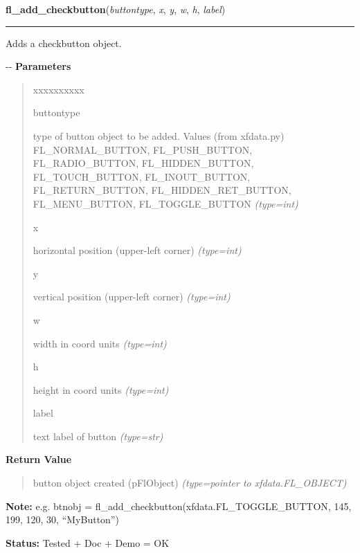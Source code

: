\hspace{.8\funcindent}\begin{boxedminipage}{\funcwidth}

    \raggedright \textbf{fl\_add\_checkbutton}(\textit{buttontype}, \textit{x}, \textit{y}, \textit{w}, \textit{h}, \textit{label})

    \vspace{-1.5ex}

    \rule{\textwidth}{0.5\fboxrule}
\setlength{\parskip}{2ex}

Adds a checkbutton object.

-{}-
\setlength{\parskip}{1ex}
      \textbf{Parameters}
      \vspace{-1ex}

      \begin{quote}
        \begin{Ventry}{xxxxxxxxxx}

          \item[buttontype]


type of button object to be added. Values (from xfdata.py)
FL\_NORMAL\_BUTTON, FL\_PUSH\_BUTTON, FL\_RADIO\_BUTTON, FL\_HIDDEN\_BUTTON,
FL\_TOUCH\_BUTTON, FL\_INOUT\_BUTTON, FL\_RETURN\_BUTTON,
FL\_HIDDEN\_RET\_BUTTON, FL\_MENU\_BUTTON, FL\_TOGGLE\_BUTTON
            {\it (type=int)}

          \item[x]


horizontal position (upper-left corner)
            {\it (type=int)}

          \item[y]


vertical position (upper-left corner)
            {\it (type=int)}

          \item[w]


width in coord units
            {\it (type=int)}

          \item[h]


height in coord units
            {\it (type=int)}

          \item[label]


text label of button
            {\it (type=str)}

        \end{Ventry}

      \end{quote}

      \textbf{Return Value}
    \vspace{-1ex}

      \begin{quote}

button object created (pFlObject)
      {\it (type=pointer to xfdata.FL\_OBJECT)}

      \end{quote}

\textbf{Note:} 
e.g. btnobj = fl\_add\_checkbutton(xfdata.FL\_TOGGLE\_BUTTON, 145,
199, 120, 30, ``MyButton'')


\textbf{Status:} 
Tested + Doc + Demo = OK


    \end{boxedminipage}

